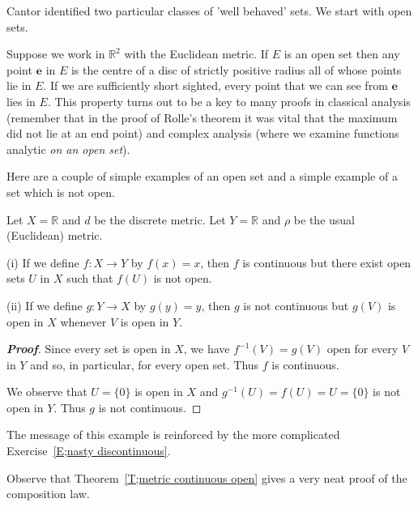 Cantor identified two particular classes of 'well behaved'
sets. We start with open sets.




Suppose we work in ${\mathbb R}^{2}$ with the Euclidean
metric. If $E$ is an open set then any point ${\mathbf e}$ in $E$
is the centre of a disc of strictly positive radius
all of whose points lie in $E$. If we are sufficiently
short sighted, every point that we can see from ${\mathbf e}$
lies in $E$. This property turns out to be a key to
many proofs in classical analysis (remember that in the
proof of Rolle's theorem it was vital that the maximum
did not lie at an end point) and complex analysis
(where we examine functions analytic \emph{on an open set}).

Here are a couple of simple examples of an open set
and a simple example
of a set which is not open.









\begin{theorem}\label{T;open not continuous}
Let $X={\mathbb R}$ and $d$ be the discrete metric. Let $Y={\mathbb R}$ and $\rho$ be the usual (Euclidean) metric.

(i) If we define $f:X\rightarrow Y$ by $f(x)=x$, then $f$ is continuous but there exist open sets $U$ in $X$ such that $f(U)$ is not open.

(ii) If we define $g:Y\rightarrow X$ by $g(y)=y$, then $g$ is not continuous
but $g(V)$ is open in $X$ whenever $V$ is open in $Y$.
\end{theorem}

\begin{proof}[\bf Proof] Since every set is open in $X$, we have
$f^{-1}(V)=g(V)$ open for every $V$ in $Y$ and so, in particular,
for every open set. Thus $f$ is continuous.

We observe that $U=\{0\}$ is open in $X$
and $g^{-1}(U)=f(U)=U=\{0\}$
is not open in $Y$. Thus $g$ is not continuous.
\end{proof}

The message of this example is reinforced by the more complicated Exercise~\ref{E;nasty discontinuous}.

Observe that Theorem~\ref{T;metric continuous open} gives a very neat proof of the composition law.


